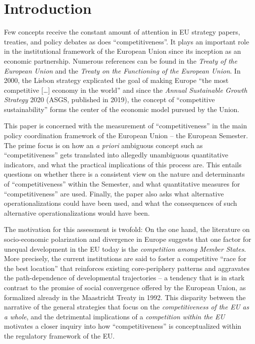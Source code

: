 \documentclass[
]{article}
\begin{document}
\newpage
{}
\setcounter{page}{1}

\hypertarget{intro}{%
\section{Introduction}\label{intro}}

Few concepts receive the constant amount of attention in EU strategy papers,
treaties, and policy debates as does \enquote{competitiveness}.
It plays an important role in
the institutional framework of the European Union since its inception as
an economic partnership. Numerous references can be found in the
\emph{Treaty of the European Union} and the
\emph{Treaty on the Functioning of the European Union}. In 2000, the Lisbon strategy
explicated the goal of making Europe \enquote{the most competitive {[}\ldots{]} economy in the
world} and since the \emph{Annual Sustainable Growth Strategy} 2020 (ASGS, published
in 2019), the
concept of \enquote{competitive sustainability} forms the center of the economic model
pursued by the Union.

This paper is concerned with the measurement of \enquote{competitiveness}
in the main policy coordination framework of the European Union
-- the European Semester.
The prime focus is on how an \emph{a priori} ambiguous concept such as
\enquote{competitiveness} gets translated into allegedly unambiguous quantitative
indicators, and what the practical implications of this process are.
This entails questions on whether there is a consistent view on the nature
and determinants of \enquote{competitiveness} within the Semester, and
what quantitative measures for \enquote{competitiveness} are used.
Finally, the paper also asks what alternative operationalizations
could have been used, and what the consequences of such alternative
operationalizations would have been.

The motivation for this assessment is twofold:
On the one hand, the literature on socio-economic polarization and divergence
in Europe suggests that one factor for
unequal development in the EU today is the \emph{competition among Member States}.
More precisely, the current institutions are
said to foster a competitive \enquote{race for the best location}
that reinforces existing core-periphery patterns and aggravates
the path-dependence of developmental trajectories
\citep[e.g.][]{Kapeller:2019cds} -- a tendency that is in stark contrast to the
promise of social convergence offered by the European Union, as formalized
already in the Maastricht Treaty in 1992. This disparity
between the narrative of the general strategies that focus on the
\emph{competitiveness of the EU as a whole}, and the detrimental implications of a
\emph{competition within the EU} motivates a closer inquiry into how
\enquote{competitiveness} is conceptualized within the regulatory framework of the
EU.
\end{document}
